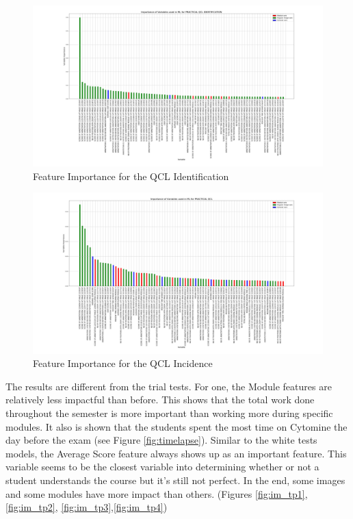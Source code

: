 \documentclass[a4paper,11pt]{report}
\numberwithin{figure}{section} %
\begin{document}
      \begin{figure}[H]
      \centering
      \includegraphics[width=.95\linewidth]{plots/var_importance_PRACTICAL_QCL_IDENTIFICATION_2018-04-29_14_34_11.png}
      \caption{Feature Importance for the QCL Identification}
      \label{fig:var_tp3}
      \end{figure}
      
      \begin{figure}[H]
      \centering
      \includegraphics[width=.95\linewidth]{plots/var_importance_PRACTICAL_QCL_2018-04-29_14_33_44.png}
      \caption{Feature Importance for the QCL Incidence}
      \label{fig:var_tp4}
      \end{figure}

The results are different from the trial tests.
For one, the Module features are relatively less impactful than before.
This shows that the total work done throughout the semester is more important than working more during specific modules.
It also is shown that the students spent the most time on Cytomine the day before the exam (see Figure \ref{fig:timelapse}).
Similar to the white tests models, the Average Score feature always shows up as an important feature.
This variable seems to be the closest variable into determining whether or not a student understands the course but it's still not perfect.
In the end, some images and some modules have more impact than others.  (Figures \ref{fig:im_tp1}, \ref{fig:im_tp2}, \ref{fig:im_tp3},\ref{fig:im_tp4})
\end{document}
